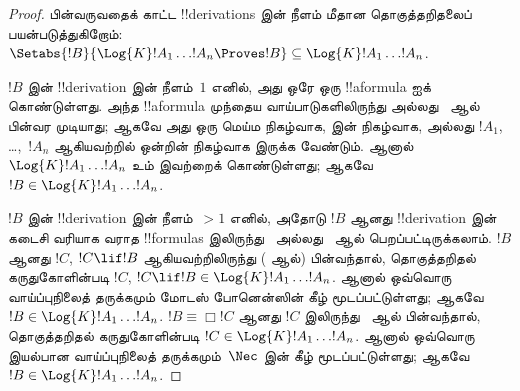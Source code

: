 \documentclass[../../../include/open-logic-section]{subfiles}
\begin{document}
\begin{proof}
  பின்வருவதைக் காட்ட !!{derivation}s இன் நீளம் மீதான தொகுத்தறிதலைப்
  பயன்படுத்துகிறோம்:
  $\Setabs{!B}{\Log{K} !A_1 \dots !A_n \Proves !B} \subseteq
  \Log{K} !A_1 \dots !A_n$.

  $!B$ இன் !!{derivation} இன் நீளம்~$1$ எனில், அது ஒரே ஒரு
  !!a{formula} ஐக் கொண்டுள்ளது. அந்த !!a{formula} முந்தைய வாய்பாடுகளிலிருந்து
  \MP{} அல்லது~\Nec{} ஆல் பின்வர முடியாது; ஆகவே அது ஒரு மெய்ம நிகழ்வாக,
   இன் நிகழ்வாக,
  அல்லது $!A_1$, \dots,~$!A_n$ ஆகியவற்றில் ஒன்றின் நிகழ்வாக இருக்க வேண்டும்.
  ஆனால் $\Log{K}!A_1\dots!A_n$ உம் இவற்றைக் கொண்டுள்ளது; ஆகவே
  $!B \in \Log{K}!A_1 \dots !A_n$.

  $!B$ இன் !!{derivation} இன் நீளம்~$> 1$ எனில், அதோடு $!B$ ஆனது
  !!{derivation} இன் கடைசி வரியாக வராத !!{formula}s இலிருந்து~\MP{}
  அல்லது~\Nec{} ஆல் பெறப்பட்டிருக்கலாம். $!B$ ஆனது $!C$, $!C \lif !B$
  ஆகியவற்றிலிருந்து (\MP{} ஆல்) பின்வந்தால், தொகுத்தறிதல் கருதுகோளின்படி
  $!C$, $!C \lif !B \in \Log{K}!A_1 \dots !A_n$. ஆனால் ஒவ்வொரு
  வாய்ப்புநிலைத் தருக்கமும் மோடஸ் போனென்ஸின் கீழ் மூடப்பட்டுள்ளது; ஆகவே
  $!B \in \Log{K}!A_1 \dots !A_n$. $!B \equiv \Box !C$ ஆனது $!C$
  இலிருந்து~\Nec{} ஆல் பின்வந்தால், தொகுத்தறிதல் கருதுகோளின்படி
  $!C \in \Log{K}!A_1 \dots !A_n$. ஆனால் ஒவ்வொரு இயல்பான வாய்ப்புநிலைத்
  தருக்கமும்~$\Nec$ இன் கீழ் மூடப்பட்டுள்ளது; ஆகவே
  $!B \in \Log{K}!A_1\dots!A_n$.


\end{proof}
\end{document}
